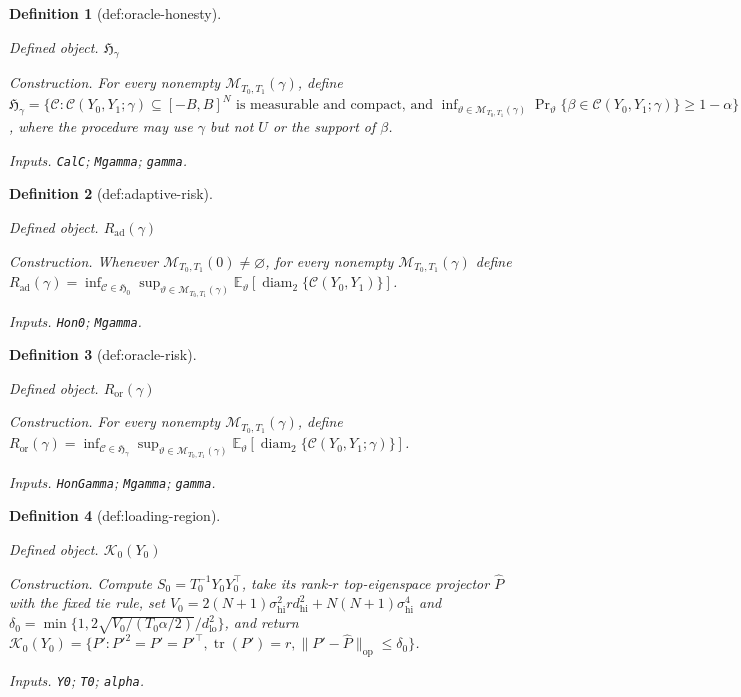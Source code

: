 \documentclass{article}
\newtheorem{definition}{Definition}
\begin{document}
\begin{definition}[def:oracle-honesty]\label{def:oracle-honesty}
\par\smallskip\noindent\emph{Defined object.} \(\mathfrak H_\gamma\)
\par\smallskip\noindent\emph{Construction.} For every nonempty \(\mathcal M_{T_0,T_1}(\gamma)\), define \(\mathfrak H_\gamma=\{\mathcal C:\mathcal C(Y_0,Y_1;\gamma)\subseteq[-B,B]^N\text{ is measurable and compact, and }\inf_{\vartheta\in\mathcal M_{T_0,T_1}(\gamma)}\Pr_\vartheta\{\beta\in\mathcal C(Y_0,Y_1;\gamma)\}\ge1-\alpha\}\), where the procedure may use \(\gamma\) but not \(U\) or the support of \(\beta\).
\par\smallskip\noindent\emph{Inputs.} \texttt{CalC}; \texttt{Mgamma}; \texttt{gamma}.
\end{definition}

\begin{definition}[def:adaptive-risk]\label{def:adaptive-risk}
\par\smallskip\noindent\emph{Defined object.} \(R_{\mathrm{ad}}(\gamma)\)
\par\smallskip\noindent\emph{Construction.} Whenever \(\mathcal M_{T_0,T_1}(0)\ne\varnothing\), for every nonempty \(\mathcal M_{T_0,T_1}(\gamma)\) define \(R_{\mathrm{ad}}(\gamma)=\inf_{\mathcal C\in\mathfrak H_0}\sup_{\vartheta\in\mathcal M_{T_0,T_1}(\gamma)}\mathbb E_\vartheta[\operatorname{diam}_2\{\mathcal C(Y_0,Y_1)\}]\).
\par\smallskip\noindent\emph{Inputs.} \texttt{Hon0}; \texttt{Mgamma}.
\end{definition}

\begin{definition}[def:oracle-risk]\label{def:oracle-risk}
\par\smallskip\noindent\emph{Defined object.} \(R_{\mathrm{or}}(\gamma)\)
\par\smallskip\noindent\emph{Construction.} For every nonempty \(\mathcal M_{T_0,T_1}(\gamma)\), define \(R_{\mathrm{or}}(\gamma)=\inf_{\mathcal C\in\mathfrak H_\gamma}\sup_{\vartheta\in\mathcal M_{T_0,T_1}(\gamma)}\mathbb E_\vartheta[\operatorname{diam}_2\{\mathcal C(Y_0,Y_1;\gamma)\}]\).
\par\smallskip\noindent\emph{Inputs.} \texttt{HonGamma}; \texttt{Mgamma}; \texttt{gamma}.
\end{definition}

\begin{definition}[def:loading-region]\label{def:loading-region}
\par\smallskip\noindent\emph{Defined object.} \(\mathcal K_0(Y_0)\)
\par\smallskip\noindent\emph{Construction.} Compute \(S_0=T_0^{-1}Y_0Y_0^{\top}\), take its rank-\(r\) top-eigenspace projector \(\widehat P\) with the fixed tie rule, set \(V_0=2(N+1)\sigma_{\mathrm{hi}}^2rd_{\mathrm{hi}}^2+N(N+1)\sigma_{\mathrm{hi}}^4\) and \(\delta_0=\min\{1,2\sqrt{V_0/(T_0\alpha/2)}/d_{\mathrm{lo}}^2\}\), and return \(\mathcal K_0(Y_0)=\{P':P'^2=P'=P'^{\top},\operatorname{tr}(P')=r,\|P'-\widehat P\|_{\mathrm{op}}\le\delta_0\}\).
\par\smallskip\noindent\emph{Inputs.} \texttt{Y0}; \texttt{T0}; \texttt{alpha}.
\end{definition}
\end{document}
